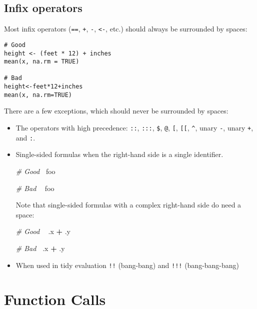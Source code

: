 \documentclass[
]{book}
\newenvironment{Shaded}{\begin{snugshade}}{\end{snugshade}}
\newcommand{\CommentTok}[1]{\textcolor[rgb]{0.56,0.35,0.01}{\textit{#1}}}
\newcommand{\NormalTok}[1]{#1}
\newcommand{\OperatorTok}[1]{\textcolor[rgb]{0.81,0.36,0.00}{\textbf{#1}}}
\newcommand{\StringTok}[1]{\textcolor[rgb]{0.31,0.60,0.02}{#1}}
\begin{document}
\hypertarget{infix-operators}{%
\subsection{Infix operators}\label{infix-operators}}

Most infix operators (\texttt{==}, \texttt{+}, \texttt{-}, \texttt{\textless{}-}, etc.) should always be surrounded
by spaces:

\begin{verbatim}
# Good
height <- (feet * 12) + inches
mean(x, na.rm = TRUE)

# Bad
height<-feet*12+inches
mean(x, na.rm=TRUE)
\end{verbatim}

There are a few exceptions, which should never be surrounded by spaces:

\begin{itemize}
\item
  The operators with high precedence: \texttt{::}, \texttt{:::}, \texttt{\$}, \texttt{@}, \texttt{{[}}, \texttt{{[}{[}}, \texttt{\^{}},
  unary \texttt{-}, unary \texttt{+}, and \texttt{:}.
\item
  Single-sided formulas when the right-hand side is a single identifier.

\begin{Shaded}
\begin{Highlighting}[]
\CommentTok{# Good}
\OperatorTok{~}\NormalTok{foo}

\CommentTok{# Bad}
\OperatorTok{~}\StringTok{ }\NormalTok{foo}
\end{Highlighting}
\end{Shaded}

  Note that single-sided formulas with a complex right-hand side do need a space:

\begin{Shaded}
\begin{Highlighting}[]
\CommentTok{# Good}
\OperatorTok{~}\StringTok{ }\NormalTok{.x }\OperatorTok{+}\StringTok{ }\NormalTok{.y}

\CommentTok{# Bad}
\OperatorTok{~}\NormalTok{.x }\OperatorTok{+}\StringTok{ }\NormalTok{.y}
\end{Highlighting}
\end{Shaded}
\item
  When used in tidy evaluation \texttt{!!} (bang-bang) and \texttt{!!!} (bang-bang-bang)
\end{itemize}

\hypertarget{function-calls}{%
\section{Function Calls}\label{function-calls}}
\end{document}
